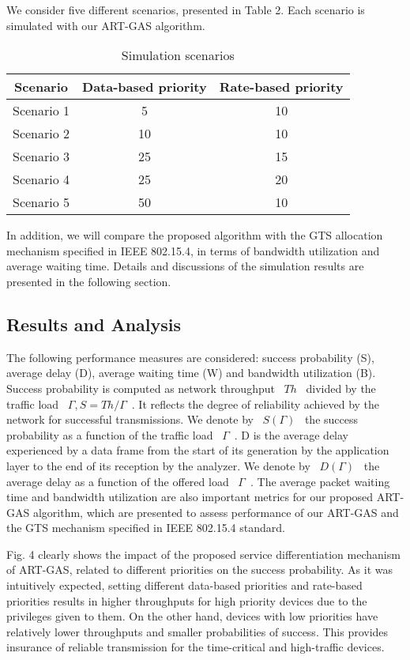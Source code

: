 \documentclass[letterpaper]{sig-alternate-10pt}
\begin{document}
We consider five different scenarios, presented in Table 2. Each scenario is simulated with our ART-GAS algorithm.


\begin{table}[!t]\renewcommand{\captionfont}{\bfseries}
\setlength{\abovecaptionskip}{0pt}
\setlength{\belowcaptionskip}{5pt}
\centering
\caption{Simulation scenarios} \begin{tabular}{|c|c|c|}\hline Scenario&Data-based priority&Rate-based priority\\
\hline
Scenario 1&5&10\\
\cline{1-3}
Scenario 2&10&10\\
\cline{1-3}
Scenario 3&25&15\\
\cline{1-3}
Scenario 4&25&20\\
\cline{1-3}
Scenario 5&50&10\\
\hline
\end{tabular}
\end{table}

In addition, we will compare the proposed algorithm with the GTS allocation mechanism specified in IEEE 802.15.4, in terms of bandwidth utilization and average waiting time. Details and discussions of the simulation results are presented in the following section.

\subsection{Results and Analysis}
The following performance measures are considered: success probability (S), average delay (D), average waiting time (W) and bandwidth utilization (B). Success probability is computed as network throughput ~$Th$~ divided by the traffic load ~$\Gamma, S = Th/\Gamma$~. It reflects the degree of reliability achieved by the network for successful transmissions. We denote by ~$S(\Gamma )$~ the success probability as a function of the traffic load ~$\Gamma$~. D is the average delay experienced by a data frame from the start of its generation by the application layer to the end of its reception by the analyzer. We denote by ~$D(\Gamma)$~ the average delay as a function of the offered load ~$\Gamma$~. The average packet waiting time and bandwidth utilization are also important metrics for our proposed ART-GAS algorithm, which are presented to assess performance of our ART-GAS and the GTS mechanism specified in IEEE 802.15.4 standard.

Fig. 4 clearly shows the impact of the proposed service differentiation mechanism of ART-GAS, related to different priorities on the success probability. As it was intuitively expected, setting different data-based priorities and rate-based priorities results in higher throughputs for high priority devices due to the privileges given to them. On the other hand, devices with low priorities have relatively lower throughputs and smaller probabilities of success. This provides insurance of reliable transmission for the time-critical and high-traffic devices.
\end{document}
